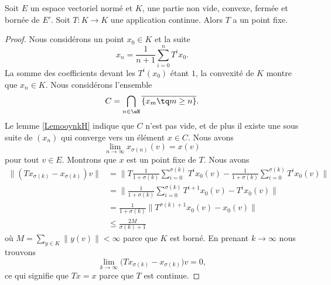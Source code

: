 \begin{theorem}   \label{ThoeJCdMP}
    Soit \( E\) un espace vectoriel normé et \( K\), une partie non vide, convexe, fermée et bornée de \( E'\). Soit \( T\colon K\to K\) une application continue. Alors \( T\) a un point fixe.
\end{theorem}

\begin{proof}
    Nous considérons un point \( x_0\in K\) et la suite
    \begin{equation}
        x_n=\frac{1}{ n+1 }\sum_{i=0}^n T^ix_0.
    \end{equation}
    La somme des coefficients devant les \( T^i(x_0)\) étant \( 1\), la convexité de \( K\) montre que \( x_n\in K\). Nous considérons l'ensemble
    \begin{equation}
        C=\bigcap_{n\in \eN}\overline{ \{ x_m\tq m\geq n \} }.
    \end{equation}
    Le lemme \ref{LemooynkH} indique que \( C\) n'est pas vide, et de plus il existe une sous suite de \( (x_n)\) qui converge vers un élément \( x\in C\). Nous avons
    \begin{equation}
        \lim_{n\to \infty} x_{\sigma(n)}(v)=x(v)
    \end{equation}
    pour tout \( v\in E\). Montrons que \( x\) est un point fixe de \( T\). Nous avons
    \begin{subequations}
        \begin{align}
            \| (Tx_{\sigma(k)}-x_{\sigma(k)})v \|&=\Big\| T\frac{1}{ 1+\sigma(k) }\sum_{i=0}^{\sigma(k)}T^ix_0(v)-\frac{1}{ 1+\sigma(k) }\sum_{i=0}^{\sigma(k)}T^ix_0(v) \Big\|\\
            &=\Big\| \frac{1}{ 1+\sigma(k) }\sum_{i=0}^{\sigma(k)}T^{i+1}x_0(v)-T^ix_0(v) \Big\|\\
            &=\frac{1}{ 1+\sigma(k) }\big\| T^{\sigma(k)+1}x_0(v)-x_0(v) \big\|\\
            &\leq\frac{ 2M }{ \sigma(k)+1 }
        \end{align}
    \end{subequations}
    où \( M=\sum_{y\in K}\| y(v) \|<\infty\) parce que \( K\) est borné. En prenant \( k\to\infty\) nous trouvons
    \begin{equation}
        \lim_{k\to \infty} \big( Tx_{\sigma(k)}-x_{\sigma(k)} \big)v=0,
    \end{equation}
    ce qui signifie que \( Tx=x\) parce que \( T\) est continue.
\end{proof}

